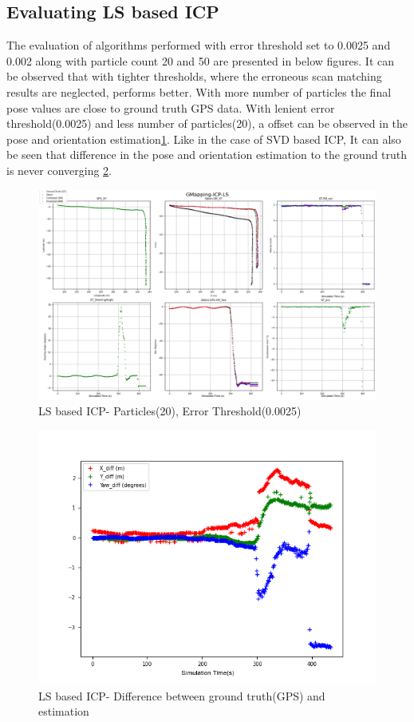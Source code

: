 \subsection{Evaluating LS based ICP}
The evaluation of algorithms performed with error threshold set to 0.0025 and  0.002 along with particle count 20 and 50 are presented in below figures. It can be observed that with tighter thresholds, where the erroneous scan matching results are neglected, performs better. With more number of particles the final pose values are close to ground truth GPS data.
With lenient error threshold(0.0025) and less number of particles(20), a offset can be observed in the pose and orientation estimation\ref{fig:LS_20_0.0025}. Like in the case of SVD based ICP, It can also be seen that difference in the pose and orientation estimation to the ground truth is never converging \ref{fig:LS_20_0.0025_diff}.
    \begin{figure}[h] 
        \includegraphics[height=0.6\textwidth]{images/GMapping-ICP-LS_Map_20_0.0025.png}
        \caption{LS based ICP- Particles(20), Error Threshold(0.0025)}
        \label{fig:LS_20_0.0025}
    \end{figure}
    \begin{figure}[h] 
        \includegraphics[height=0.4\textwidth]{images/GMapping-ICP-LS_True_vs_Crct_20_0.0025.png}
        \caption{LS based ICP- Difference between ground truth(GPS) and estimation}
        \label{fig:LS_20_0.0025_diff}
    \end{figure}
